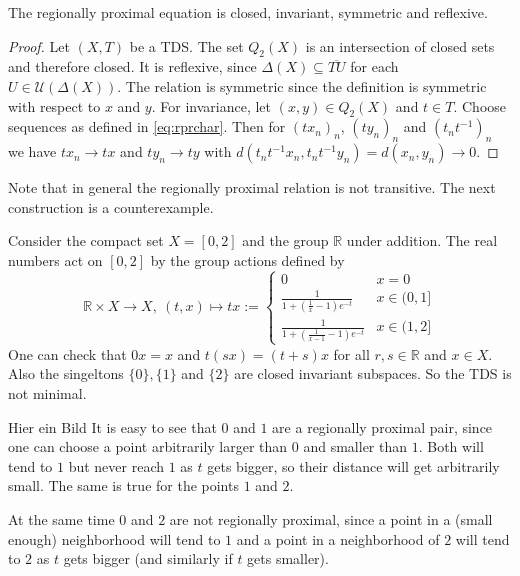 \begin{theorem}
  The regionally proximal equation is closed, invariant, symmetric and reflexive.
\end{theorem}

\begin{proof}
  Let $(X, T)$ be a TDS.
  The set $Q_2(X)$ is an intersection of closed sets and therefore closed.
  It is reflexive, since $\Delta(X) \subseteq \overline{TU}$ for each $U \in \mathcal{U}(\Delta(X))$.
  The relation is symmetric since the definition is symmetric with respect to $x$ and $y$.
  For invariance, let $(x, y) \in Q_2(X)$ and $t \in T$.
  Choose sequences as defined in \cref{eq:rprchar}.
  Then for $(tx_n)_n$, $(t y_n)_n$ and $(t_nt^{-1})_n$ we have $t x_n \to tx$ and $t y_n \to ty$ with $d(t_nt^{-1}x_n, t_nt^{-1}y_n) = d(x_n, y_n) \to 0$.
\end{proof}

Note that in general the regionally proximal relation is not transitive.
The next construction is a counterexample.

\begin{example}
  Consider the compact set $X = [0, 2]$ and the group $\mathbb{R}$ under addition.
  The real numbers act on $[0, 2]$ by the group actions defined by
  \begin{equation*}
    \mathbb{R} \times X \to X, \ (t, x) \mapsto 
    tx := \begin{cases}
      0 & x = 0 \\
      \frac{1}{1 + (\frac{1}{x} - 1)e^{-t}} & x \in (0, 1] \\
      \frac{1}{1 + (\frac{1}{x - 1} - 1)e^{-t}} & x \in (1, 2]
    \end{cases}
  \end{equation*}
  One can check that $0x = x$ and $t(sx) = (t + s)x$ for all $r, s \in \mathbb{R}$ and $x \in X$.
  Also the singeltons $\{ 0 \}, \{ 1 \}$ and $\{ 2 \}$ are closed invariant subspaces.
  So the TDS is not minimal.

  {\color{red} Hier ein Bild}
  It is easy to see that $0$ and $1$ are a regionally proximal pair,
  since one can choose a point arbitrarily larger than $0$ and smaller than $1$.
  Both will tend to $1$ but never reach $1$ as $t$ gets bigger,
  so their distance will get arbitrarily small.
  The same is true for the points $1$ and $2$.

  At the same time $0$ and $2$ are not regionally proximal,
  since a point in a (small enough) neighborhood will tend to $1$ and a point in a neighborhood of $2$ will tend to $2$ as $t$ gets bigger
  (and similarly if $t$ gets smaller).
\end{example}

